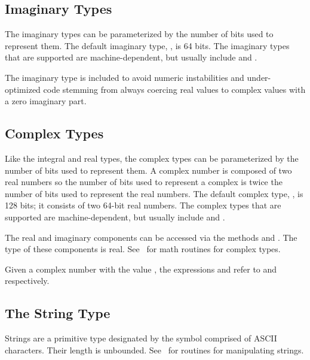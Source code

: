\subsection{Imaginary Types}
\label{Imaginary_Types}

The imaginary types can be parameterized by the number of bits used to
represent them.  The default imaginary type, , is 64 bits.
The imaginary types that are supported are machine-dependent, but
usually include  and .

\begin{rationale}
The imaginary type is included to avoid numeric instabilities and
under-optimized code stemming from always coercing real values to
complex values with a zero imaginary part.
\end{rationale}

\subsection{Complex Types}
\label{Complex_Types}

Like the integral and real types, the complex types can be
parameterized by the number of bits used to represent them.  A complex
number is composed of two real numbers so the number of bits used to
represent a complex is twice the number of bits used to represent the
real numbers.  The default complex type, , is 128 bits;
it consists of two 64-bit real numbers.  The complex types that are
supported are machine-dependent, but usually
include  and .

The real and imaginary components can be accessed via the methods
 and .  The type of these components is real.
See~ for math routines for complex types.

\begin{example}
Given a complex number  with the value , the
expressions  and  refer to 
and  respectively.
\end{example}

\subsection{The String Type}
\label{The_String_Type}

Strings are a primitive type designated by the symbol 
comprised of ASCII characters.  Their length is unbounded.
See~ for routines for manipulating strings.



